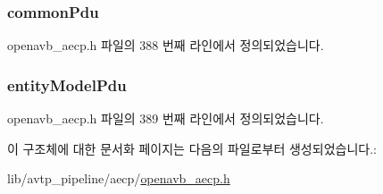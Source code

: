 \subsubsection[{\texorpdfstring{common\+Pdu}{commonPdu}}]{ common\+Pdu}\hypertarget{structopenavb__aecp__data__unit__t_ad6f02622785f0b6f92ab4329f747e01e}{}\label{structopenavb__aecp__data__unit__t_ad6f02622785f0b6f92ab4329f747e01e}


openavb\+\_\+aecp.\+h 파일의 388 번째 라인에서 정의되었습니다.

\subsubsection[{\texorpdfstring{entity\+Model\+Pdu}{entityModelPdu}}]{ entity\+Model\+Pdu}\hypertarget{structopenavb__aecp__data__unit__t_a837e0716e898f24be1096090abd03bd3}{}\label{structopenavb__aecp__data__unit__t_a837e0716e898f24be1096090abd03bd3}


openavb\+\_\+aecp.\+h 파일의 389 번째 라인에서 정의되었습니다.



이 구조체에 대한 문서화 페이지는 다음의 파일로부터 생성되었습니다.\+:\begin{DoxyCompactItemize}
\item 
lib/avtp\+\_\+pipeline/aecp/\hyperlink{openavb__aecp_8h}{openavb\+\_\+aecp.\+h}\end{DoxyCompactItemize}
